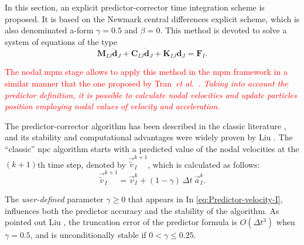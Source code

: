 \documentclass[preprint,12pt,a4paper]{elsarticle}
\newcommand{\Matrix}[1]{
  \ensuremath{\mathbf{{#1}}}
}
\newcommand{\Vector}[1]{
  \ensuremath{\mathbf{{#1}}}
}
\newcommand{\red}[1]{
  \textcolor{red}{{#1}}
}
\begin{document}
In this section, an explicit predictor-corrector time integration
scheme is proposed. It is based on the Newmark central differences explicit scheme, which is also denominated a-form 
$\gamma = 0.5$ and $\beta = 0$. This method is devoted to solve a system of equations of the type
\begin{equation*}
  \Matrix{M}_{IJ}\ddot{\Vector{d}}_{J} + \Matrix{C}_{IJ}\dot{\Vector{d}}_{J} +
  \Matrix{K}_{IJ}\Vector{d}_{J} = \Vector{F}_{I}.
\end{equation*}
\red{The nodal \acrshort{mpm} stage allows to apply this method
in the \acrshort{mpm} framework in a similar manner that the one
proposed by Tran~\it{et al.}~\cite{Tran2019e}. Taking into account the predictor definition, it is possible to calculate
nodal velocities and update particles position employing nodal values
of velocity and acceleration.} 

The predictor-corrector algorithm has
been described in the classic literature \cite{Hughes2000}, and its
stability and computational advantages were widely proven by Liu
\cite{Xiaojian94}. The ``classic'' \acrfull{npc} algorithm starts with a
predicted value of the nodal velocities at the $(k+1)$th time step, denoted by $\vec{\tilde{v}}_I^{k+1}$, which is calculated as follows:
\begin{equation}
  \label{eq:Predictor-velocity-I}
  \vec{\tilde{v}}_I^{k+1} = \vec{v}_I^k + (1 - \gamma)\ \Delta t\ \vec{a}_I^k.
\end{equation}

The \textit{user-defined}
parameter $\gamma \geq 0$ that appears in In \eqref{eq:Predictor-velocity-I}, influences both the predictor accuracy
and the stability of the algorithm. As pointed out Liu
\cite{Xiaojian94}, the truncation error of the predictor formula is
$O(\Delta t^3)$ when $\gamma = 0.5$, and is unconditionally stable if
$ 0 < \gamma \leq 0.25$.
\end{document}
